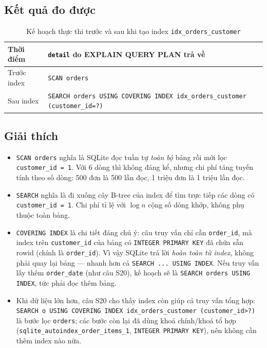 \documentclass[12pt,a4paper]{article}
\newcommand{\code}[1]{\texttt{\small #1}}
\begin{document}
\subsection{Kết quả đo được}

\begin{table}[H]
\centering
\caption{Kế hoạch thực thi trước và sau khi tạo index \code{idx\_orders\_customer}}
\label{tab:explain}
\small
\begin{tabularx}{\linewidth}{@{}l X@{}}
\toprule
\textbf{Thời điểm} & \textbf{\code{detail} do EXPLAIN QUERY PLAN trả về} \\
\midrule
Trước index & \code{SCAN orders} \\
Sau index   & \code{SEARCH orders USING COVERING INDEX idx\_orders\_customer (customer\_id=?)} \\
\bottomrule
\end{tabularx}
\end{table}

\subsection{Giải thích}

\begin{itemize}[leftmargin=1.2cm,itemsep=3pt]
  \item \code{SCAN orders} nghĩa là SQLite đọc tuần tự \emph{toàn bộ} bảng rồi mới lọc
        \code{customer\_id = 1}. Với 6 dòng thì không đáng kể, nhưng chi phí tăng tuyến tính theo
        số dòng: 500 đơn là 500 lần đọc, 1 triệu đơn là 1 triệu lần đọc.
  \item \code{SEARCH} nghĩa là đi xuống cây B-tree của index để tìm trực tiếp các dòng có
        \code{customer\_id = 1}. Chi phí tỉ lệ với $\log n$ cộng số dòng khớp, không phụ thuộc
        toàn bảng.
  \item \code{COVERING INDEX} là chi tiết đáng chú ý: câu truy vấn chỉ cần \code{order\_id},
        mà index trên \code{customer\_id} của bảng có \code{INTEGER PRIMARY KEY} đã chứa sẵn
        rowid (chính là \code{order\_id}). Vì vậy SQLite trả lời \emph{hoàn toàn từ index}, không
        phải quay lại bảng --- nhanh hơn cả \code{SEARCH ... USING INDEX}. Nếu truy vấn lấy thêm
        \code{order\_date} (như câu S20), kế hoạch sẽ là \code{SEARCH orders USING INDEX}, tức
        phải đọc thêm bảng.
  \item Khi dữ liệu lớn hơn, câu S20 cho thấy index còn giúp cả truy vấn tổng hợp:
        \code{SEARCH o USING COVERING INDEX idx\_orders\_customer (customer\_id>?)} là bước lọc
        \code{orders}; các bước còn lại đã dùng khoá chính/khoá tổ hợp
        (\code{sqlite\_autoindex\_order\_items\_1}, \code{INTEGER PRIMARY KEY}), nên không cần
        thêm index nào nữa.
\end{itemize}
\end{document}

